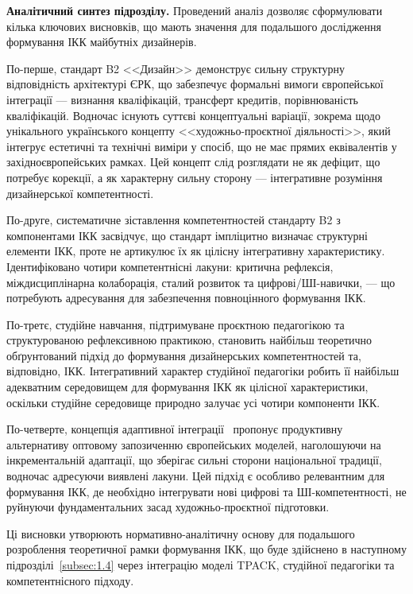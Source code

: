 \textbf{Аналітичний синтез підрозділу.} Проведений аналіз дозволяє сформулювати кілька ключових висновків, що мають значення для подальшого дослідження формування ІКК майбутніх дизайнерів.

По-перше, стандарт B2 <<Дизайн>> демонструє сильну структурну відповідність архітектурі ЄРК, що забезпечує формальні вимоги європейської інтеграції --- визнання кваліфікацій, трансферт кредитів, порівнюваність кваліфікацій. Водночас існують суттєві концептуальні варіації, зокрема щодо унікального українського концепту <<художньо-проєктної діяльності>>, який інтегрує естетичні та технічні виміри у спосіб, що не має прямих еквівалентів у західноєвропейських рамках. Цей концепт слід розглядати не як дефіцит, що потребує корекції, а як характерну сильну сторону --- інтегративне розуміння дизайнерської компетентності.

По-друге, систематичне зіставлення компетентностей стандарту B2 з компонентами ІКК засвідчує, що стандарт імпліцитно визначає структурні елементи ІКК, проте не артикулює їх як цілісну інтегративну характеристику. Ідентифіковано чотири компетентнісні лакуни: критична рефлексія, міждисциплінарна колаборація, сталий розвиток та цифрові/ШІ-навички, --- що потребують адресування для забезпечення повноцінного формування ІКК.

По-третє, студійне навчання, підтримуване проєктною педагогікою та структурованою рефлексивною практикою, становить найбільш теоретично обґрунтований підхід до формування дизайнерських компетентностей та, відповідно, ІКК. Інтегративний характер студійної педагогіки робить її найбільш адекватним середовищем для формування ІКК як цілісної характеристики, оскільки студійне середовище природно залучає усі чотири компоненти ІКК.

По-четверте, концепція адаптивної інтеграції~\cite{Musiienko2025DesignEducation} пропонує продуктивну альтернативу оптовому запозиченню європейських моделей, наголошуючи на інкрементальній адаптації, що зберігає сильні сторони національної традиції, водночас адресуючи виявлені лакуни. Цей підхід є особливо релевантним для формування ІКК, де необхідно інтегрувати нові цифрові та ШІ-компетентності, не руйнуючи фундаментальних засад художньо-проєктної підготовки.

Ці висновки утворюють нормативно-аналітичну основу для подальшого розроблення теоретичної рамки формування ІКК, що буде здійснено в наступному підрозділі~\ref{subsec:1.4} через інтеграцію моделі TPACK, студійної педагогіки та компетентнісного підходу.
